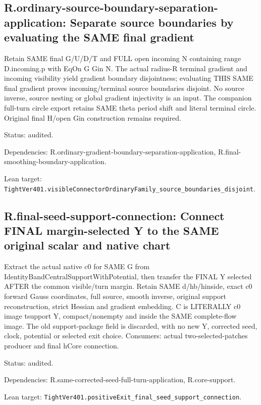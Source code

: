 \documentclass{article}
\begin{document}
\subsection*{R.ordinary-source-boundary-separation-application: Separate source boundaries by evaluating the SAME final gradient}
Retain SAME final G/U/D/T and FULL open incoming N containing range D.incoming.p with EqOn G Gin N. The actual radius-R terminal gradient and incoming visibility yield gradient boundary disjointness; evaluating THIS SAME final gradient proves incoming/terminal source boundaries disjoint. No source inverse, source nesting or global gradient injectivity is an input. The companion full-turn circle export retains SAME theta period shift and literal terminal circle. Original final H/open Gin construction remains required.
\par Status: audited.
\par Dependencies: R.ordinary-gradient-boundary-separation-application, R.final-smoothing-boundary-application.
\par Lean target: \texttt{TightVer401.visibleConnectorOrdinaryFamily\_source\_boundaries\_disjoint}.
\subsection*{R.final-seed-support-connection: Connect FINAL margin-selected Y to the SAME original scalar and native chart}
Extract the actual native c0 for SAME G from IdentityBandCentralSupportWithPotential, then transfer the FINAL Y selected AFTER the common visible/turn margin. Retain SAME d/hb/hinside, exact c0 forward Gauss coordinates, full source, smooth inverse, original support reconstruction, strict Hessian and gradient embedding. C is LITERALLY c0 image tsupport Y, compact/nonempty and inside the SAME complete-flow image. The old support-package field is discarded, with no new Y, corrected seed, clock, potential or selected exit choice. Consumers: actual two-selected-patches producer and final hCore connection.
\par Status: audited.
\par Dependencies: R.same-corrected-seed-full-turn-application, R.core-support.
\par Lean target: \texttt{TightVer401.positiveExit\_final\_seed\_support\_connection}.
\end{document}
